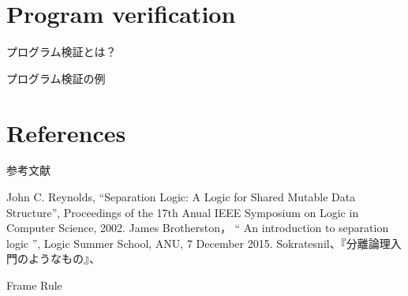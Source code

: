 \documentclass[notheorems, aspectratio=169, 12pt, unicode]{beamer}
\begin{document}
\section{Program verification}

\begin{frame}{プログラム検証とは？}
 
\end{frame}

\begin{frame}{プログラム検証の例}
 
\end{frame}

\section{References}

\begin{frame}{参考文献}
 \begin{thebibliography}{9}
   John C. Reynolds, ``Separation Logic: A Logic for Shared Mutable Data Structure'', Proceedings of the 17th Anual IEEE Symposium on Logic in Computer Science, 2002.
   James Brotherston，
	  `` An introduction to separation logic '', 
	  Logic Summer School, ANU, 7 December 2015.
 Sokratesnil、『分離論理入門のようなもの』、\url{}
 \end{thebibliography} 
\end{frame}

\appendix

\begin{frame}{Frame Rule}
 
\end{frame}
\end{document}
